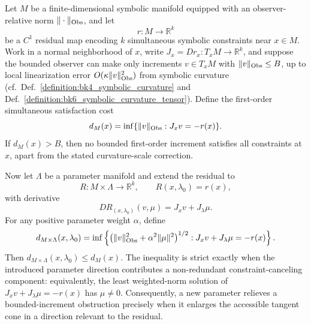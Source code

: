 \begin{theorem}
\label{theorem:appD_bounded_increment_parameter_lift}
Let \(M\) be a finite-dimensional symbolic manifold equipped with an
observer-relative norm \(\|\cdot\|_{\mathrm{Obs}}\), and let
\[
    r:M\longrightarrow \mathbb{R}^{k}
\]
be a \(C^{1}\) residual map encoding \(k\) simultaneous symbolic constraints
near \(x\in M\). Work in a normal neighborhood of \(x\), write
\(J_x = Dr_x:T_xM\to\mathbb{R}^k\), and suppose the bounded observer can make
only increments \(v\in T_xM\) with \(\|v\|_{\mathrm{Obs}}\leq B\), up to local
linearization error \(O(\kappa\|v\|_{\mathrm{Obs}}^{2})\) from symbolic curvature
(cf.~Def.~\ref{definition:bk4_symbolic_curvature} and
Def.~\ref{definition:bk6_symbolic_curvature_tensor}). Define the first-order
simultaneous satisfaction cost
\[
    d_M(x)
    =
    \inf\{\|v\|_{\mathrm{Obs}}: J_xv=-r(x)\}.
\]
If \(d_M(x)>B\), then no bounded first-order increment satisfies all
constraints at \(x\), apart from the stated curvature-scale correction.

Now let \(\Lambda\) be a parameter manifold and extend the residual to
\[
    R:M\times\Lambda\longrightarrow \mathbb{R}^{k},
    \qquad R(x,\lambda_0)=r(x),
\]
with derivative
\[
    D R_{(x,\lambda_0)}(v,\mu)=J_xv+J_{\lambda}\mu .
\]
For any positive parameter weight \(\alpha\), define
\[
    d_{M\times\Lambda}(x,\lambda_0)
    =
    \inf\left\{
      \bigl(\|v\|_{\mathrm{Obs}}^{2}+\alpha^{2}\|\mu\|^{2}\bigr)^{1/2}
      :
      J_xv+J_{\lambda}\mu=-r(x)
    \right\}.
\]
Then \(d_{M\times\Lambda}(x,\lambda_0)\leq d_M(x)\). The inequality is strict
exactly when the introduced parameter direction contributes a non-redundant
constraint-canceling component: equivalently, the least weighted-norm solution
of \(J_xv+J_{\lambda}\mu=-r(x)\) has \(\mu\neq0\). Consequently, a new
parameter relieves a bounded-increment obstruction precisely when it enlarges
the accessible tangent cone in a direction relevant to the residual.
\end{theorem}

